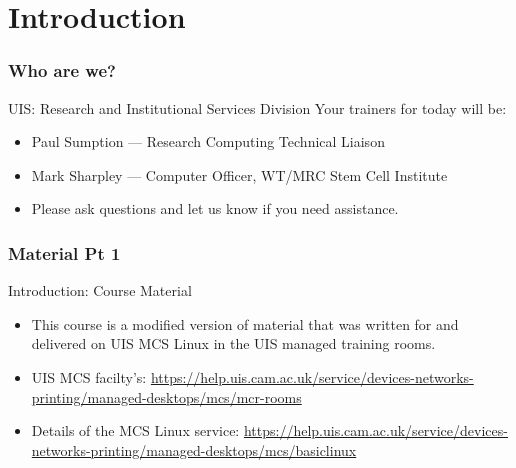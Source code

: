 \part{Introduction}
\begin{frame}
\partpage
\end{frame}


\section{Who are we?}
\begin{frame}{UIS: Research and Institutional Services Division}
Your trainers for today will be:\\
\begin{itemize}
  \item Paul Sumption --- Research Computing Technical Liaison
    \item Mark Sharpley --- Computer Officer, WT/MRC Stem Cell Institute
  \item\alert{Please ask questions and let us know if you need assistance.}
\end{itemize}
\end{frame}

\section{Material Pt 1}
\begin{frame}{Introduction: Course Material}
\begin{itemize}
\item This course is a modified version of material that was written for and delivered on UIS MCS Linux in the UIS managed training rooms.
\item UIS MCS facilty's: \url{https://help.uis.cam.ac.uk/service/devices-networks-printing/managed-desktops/mcs/mcr-rooms} 
\item Details of the MCS Linux service: \url{https://help.uis.cam.ac.uk/service/devices-networks-printing/managed-desktops/mcs/basiclinux} 
\end{itemize}
\end{frame}


